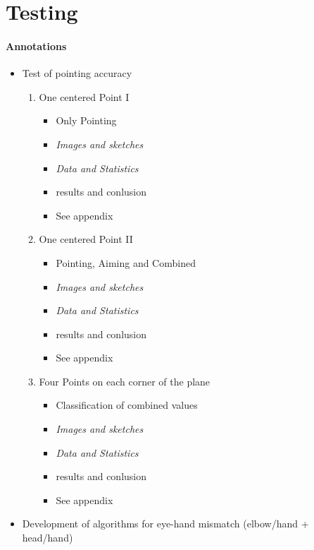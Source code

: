 
\section{Testing}
\label{conception_testing}

\paragraph{Annotations}

\begin{itemize}
	\item Test of pointing accuracy
	\begin{enumerate}
		\item One centered Point I
		\begin{itemize}
			\item Only Pointing
			\item \textit{Images and sketches}
			\item \textit{Data and Statistics}
			\item results and conlusion
			\item See appendix
		\end{itemize}
		\item One centered Point II
		\begin{itemize}
			\item Pointing, Aiming and Combined
			\item \textit{Images and sketches}
			\item \textit{Data and Statistics}
			\item results and conlusion
			\item See appendix
		\end{itemize}
		\item Four Points on each corner of the plane
		\begin{itemize}
			\item Classification of combined values
			\item \textit{Images and sketches}
			\item \textit{Data and Statistics}
			\item results and conlusion
			\item See appendix
		\end{itemize}
	\end{enumerate}
	\item Development of algorithms for eye-hand mismatch (elbow/hand + head/hand)

\end{itemize}
